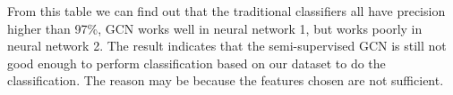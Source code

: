From this table we can find out that the traditional classifiers all have precision higher than 97\%, GCN works well in neural network 1, but works poorly in neural network 2. The result indicates that the semi-supervised GCN is still not good enough to perform classification based on our dataset to do the classification. The reason may be because the features chosen are not sufficient.

\noindent{}
